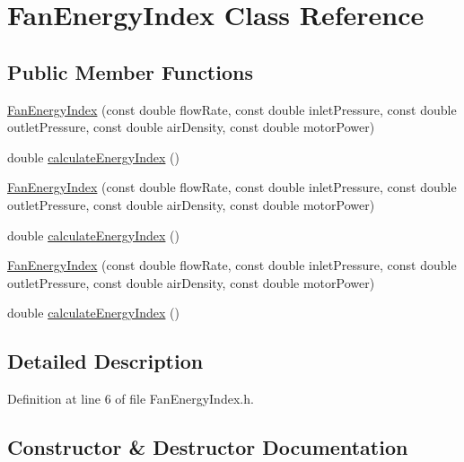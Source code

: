 \hypertarget{class_fan_energy_index}{}\section{Fan\+Energy\+Index Class Reference}
\label{class_fan_energy_index}
\subsection*{Public Member Functions}
\begin{DoxyCompactItemize}
\item 
\hyperlink{class_fan_energy_index_aea662b131f62c3b78196aabb0046c9a9}{Fan\+Energy\+Index} (const double flow\+Rate, const double inlet\+Pressure, const double outlet\+Pressure, const double air\+Density, const double motor\+Power)
\item 
double \hyperlink{class_fan_energy_index_ab1bf0268caaed615a5f00027b3801198}{calculate\+Energy\+Index} ()
\item 
\hyperlink{class_fan_energy_index_aea662b131f62c3b78196aabb0046c9a9}{Fan\+Energy\+Index} (const double flow\+Rate, const double inlet\+Pressure, const double outlet\+Pressure, const double air\+Density, const double motor\+Power)
\item 
double \hyperlink{class_fan_energy_index_ab1bf0268caaed615a5f00027b3801198}{calculate\+Energy\+Index} ()
\item 
\hyperlink{class_fan_energy_index_aea662b131f62c3b78196aabb0046c9a9}{Fan\+Energy\+Index} (const double flow\+Rate, const double inlet\+Pressure, const double outlet\+Pressure, const double air\+Density, const double motor\+Power)
\item 
double \hyperlink{class_fan_energy_index_ab1bf0268caaed615a5f00027b3801198}{calculate\+Energy\+Index} ()
\end{DoxyCompactItemize}


\subsection{Detailed Description}


Definition at line 6 of file Fan\+Energy\+Index.\+h.



\subsection{Constructor \& Destructor Documentation}
\mbox{\label{class_fan_energy_index_aea662b131f62c3b78196aabb0046c9a9}} 

